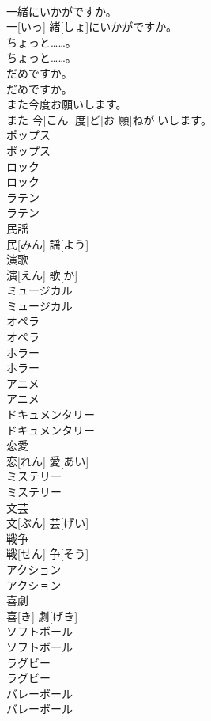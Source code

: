 \documentclass[8pt]{extreport}
\begin{document}
\begin{CJK}{UTF8}{min}
\\	一緒にいかがですか。	
\\	一[いっ] 緒[しょ]にいかがですか。		
\\	[～は]ちょっと……。	
\\	[～は]ちょっと……。		
\\	だめですか。	
\\	だめですか。		
\\	また今度お願いします。	
\\	また 今[こん] 度[ど]お 願[ねが]いします。		
\\	ポップス	
\\	ポップス		
\\	ロック	
\\	ロック		
\\	ラテン	
\\	ラテン		
\\	民謡	
\\	民[みん] 謡[よう]		
\\	演歌	
\\	演[えん] 歌[か]		
\\	ミュージカル	
\\	ミュージカル		
\\	オペラ	
\\	オペラ		
\\	ホラー	
\\	ホラー		
\\	アニメ	
\\	アニメ		
\\	ドキュメンタリー	
\\	ドキュメンタリー		
\\	恋愛	
\\	恋[れん] 愛[あい]		
\\	ミステリー	
\\	ミステリー		
\\	文芸	
\\	文[ぶん] 芸[げい]		
\\	戦争	
\\	戦[せん] 争[そう]		
\\	アクション	
\\	アクション		
\\	喜劇	
\\	喜[き] 劇[げき]		
\\	ソフトボール	
\\	ソフトボール		
\\	ラグビー	
\\	ラグビー		
\\	バレーボール	
\\	バレーボール		

\end{CJK}
\end{document}

